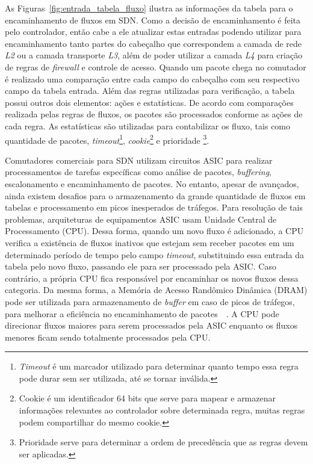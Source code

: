 As Figuras~\ref{fig:entrada_tabela_fluxo} ilustra as informações da tabela para o encaminhamento de fluxos em SDN. Como a decisão de encaminhamento é feita pelo controlador, então cabe a ele atualizar estas entradas podendo utilizar para encaminhamento tanto partes do cabeçalho que correspondem a camada de rede \textit{L2} ou a camada transporte \textit{L3}, além de poder utilizar a camada \textit{L4} para criação de regras de \textit{firewall} e controle de acesso. Quando um pacote chega no comutador é realizado uma comparação entre cada campo do cabeçalho com seu respectivo campo da tabela entrada. Além das regras utilizadas para verificação, a tabela possui outros dois elementos: ações e estatísticas. De acordo com comparações realizada pelas regras de fluxos, os pacotes são processados conforme as ações de cada regra. As estatísticas são utilizadas para contabilizar os fluxo, tais como quantidade de pacotes, \textit{timeout}\footnote{\textit{Timeout} é um marcador utilizado para determinar quanto tempo essa regra pode durar sem ser utilizada, até se tornar inválida.}, \textit{cookie}\footnote{Cookie é um identificador 64 bits que serve para mapear e armazenar informações relevantes ao controlador sobre determinada regra, muitas regras podem compartilhar do mesmo cookie.} e prioridade \footnote{Prioridade serve para determinar a ordem de precedência que as regras devem ser aplicadas. }. 	



Comutadores comerciais para SDN utilizam circuitos ASIC para realizar processamentos de tarefas específicas como análise de pacotes, \textit{buffering}, escalonamento e encaminhamento de pacotes. No entanto, apesar de avançados, ainda existem desafios para o armazenamento da grande quantidade de fluxos  em tabelas e processamento em picos inesperados de tráfegos. Para resolução de tais problemas, arquiteturas de equipamentos ASIC usam Unidade Central de Processamento (CPU). 
Dessa forma, quando um novo fluxo é adicionado, a CPU verifica a existência de fluxos inativos que estejam sem receber pacotes em um determinado período de tempo pelo campo \textit{timeout}, substituindo essa entrada da tabela pelo novo fluxo, passando ele para ser processado pela ASIC. 
Caso contrário, a própria CPU fica responsável por encaminhar os novos fluxos dessa categoria. Da mesma forma, a Memória de Acesso Randômico Dinâmica (DRAM) pode ser utilizada para armazenamento de \textit{buffer} em caso de picos de tráfegos, para melhorar a eficiência no encaminhamento de pacotes~\cite{nunes-2014}~\cite{gong2015survey}. A CPU pode direcionar fluxos maiores para serem processados pela ASIC enquanto os fluxos menores ficam sendo totalmente processados pela CPU.


